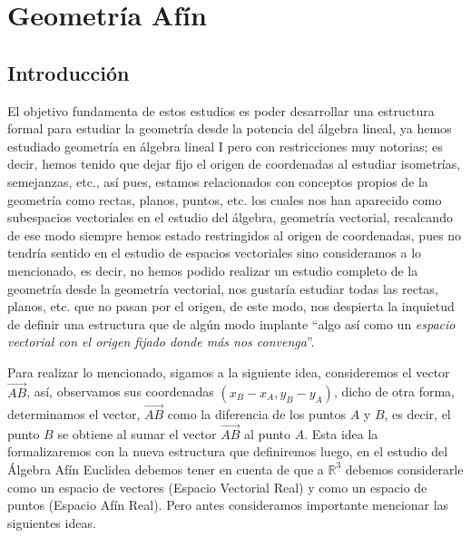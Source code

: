 \documentclass[11pt,a4paper,twoside]{book}\usepackage[]{graphicx}\usepackage[]{color}
\newcommand{\m}[1]{\mathbb{#1}}
\newcommand{\ora}[1]{\overrightarrow{#1}}
\begin{document}
\tableofcontents








\chapter{Geometría Afín}

\section{Introducción}

El objetivo fundamenta de estos estudios es poder desarrollar una estructura formal para estudiar la geometría desde la potencia del álgebra lineal, ya hemos estudiado geometría en álgebra lineal I pero con restricciones muy notorias; es decir, hemos tenido que dejar fijo el origen de coordenadas al estudiar isometrías, semejanzas, etc., así pues, estamos relacionados con conceptos propios de la geometría como rectas, planos, puntos, etc. los cuales nos han aparecido como subespacios vectoriales en el estudio del álgebra, geometría vectorial, recalcando de ese modo siempre hemos estado restringidos al origen de coordenadas, pues no tendría sentido en el estudio de espacios vectoriales sino consideramos a lo mencionado, es decir, no hemos podido realizar un estudio completo de la geometría desde la geometría vectorial, nos gustaría estudiar todas las rectas, planos, etc. que no pasan por el origen, de este modo, nos despierta la inquietud de definir una estructura que de algún modo implante ``algo así como un \emph{espacio vectorial con el origen fijado donde más nos convenga}''.\newline %

Para realizar lo mencionado, sigamos a la siguiente idea, consideremos el vector $\ora{AB}$, así, observamos sus coordenadas $(x_B-x_A, y_B-y_A)$, dicho de otra forma, determinamos el vector, $\ora{AB}$ como la diferencia de los puntos $A$ y $B$, es decir, el punto $B$ se obtiene al sumar el vector $\ora{AB}$ al punto $A$. Esta idea la formalizaremos con la nueva estructura que definiremos luego, en el estudio del Álgebra Afín Euclidea debemos tener en cuenta de que a $\m{R}^3$ debemos considerarle como un espacio de vectores (Espacio Vectorial Real) y como un espacio de puntos (Espacio Afín Real). Pero antes consideramos importante mencionar las siguientes ideas.\newline
\end{document}
